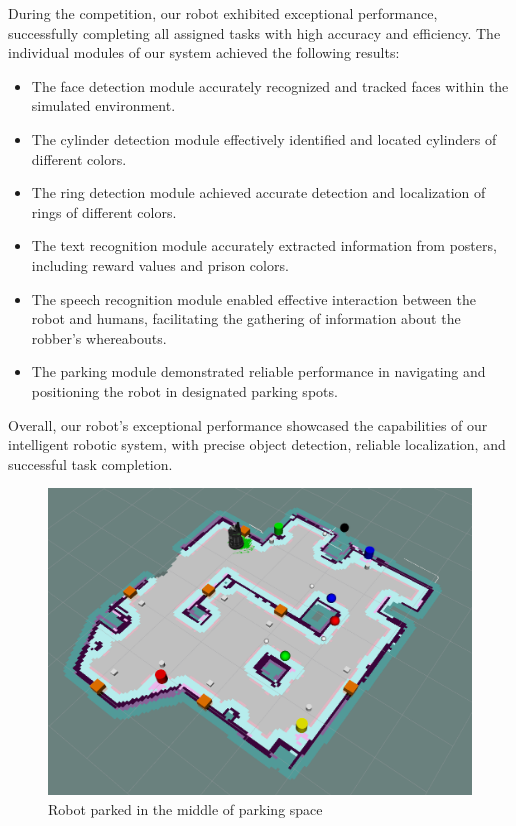 \documentclass{article}
\begin{document}
During the competition, our robot exhibited exceptional performance, successfully completing all assigned tasks with high accuracy and efficiency. The individual modules of our system achieved the following results:
\begin{itemize}
  \item The face detection module accurately recognized and tracked faces within the simulated environment.
  \item The cylinder detection module effectively identified and located cylinders of different colors.
  \item The ring detection module achieved accurate detection and localization of rings of different colors.
  \item The text recognition module accurately extracted information from posters, including reward values and prison colors.
  \item The speech recognition module enabled effective interaction between the robot and humans, facilitating the gathering of information about the robber's whereabouts.
  \item The parking module demonstrated reliable performance in navigating and positioning the robot in designated parking spots.
\end{itemize}
Overall, our robot's exceptional performance showcased the capabilities of our intelligent robotic system, with precise object detection, reliable localization, and successful task completion.

\begin{figure}
  \centering
  \includegraphics[width=\textwidth]{images/markers.png}
  \caption{Robot parked in the middle of parking space}
  \label{fig:markers}
\end{figure}
\end{document}
